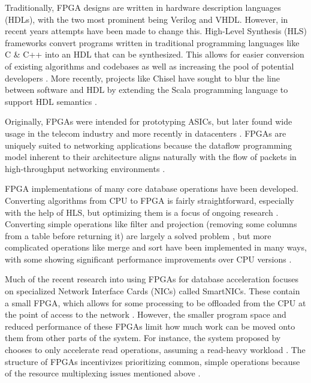 Traditionally, FPGA designs are written in hardware description languages
(HDLs), with the two most prominent being Verilog and VHDL. However, in recent
years attempts have been made to change this. High-Level Synthesis (HLS)
frameworks convert programs written in traditional programming languages like C
\& C++ into an HDL that can be synthesized. This allows for easier conversion of
existing algorithms and codebases as well as increasing the pool of potential
developers \autocite{martin-destest-2009}. More recently, projects like Chisel
have sought to blur the line between software and HDL by extending the Scala programming language to support HDL
semantics \autocite{chisel}.


\label{sec:datacenter-fpga}

Originally, FPGAs were intended for prototyping ASICs, but later found wide
usage in the telecom industry \autocite{bobda-trets-2022,mencer-queue-2020} and
more recently in datacenters \autocite{mencer-queue-2020,hoozemans-cas-2021}.
FPGAs are uniquely suited to networking applications because the dataflow
programming model \autocite{hoozemans-cas-2021} inherent to their architecture
aligns naturally with the flow of packets in high-throughput networking
environments \autocite{mueller-sigmod-2009}.

FPGA implementations of many core database operations have been developed.
Converting algorithms from CPU to FPGA is fairly straightforward, especially
with the help of HLS, but optimizing them is a focus of ongoing research
\autocite{fang-vldb-2020}. Converting simple operations like filter and
projection (removing some columns from a table before returning it) are largely
a solved problem \autocite{fang-vldb-2020}, but more complicated operations like
merge and sort have been implemented in many ways, with some showing significant
performance improvements over CPU versions
\autocite{leggett-trets-2025,moghaddamfar-damon-2021}.

Much of the recent research into using FPGAs for database acceleration focuses
on specialized Network Interface Cards (NICs) called SmartNICs. These contain a
small FPGA, which allows for some processing to be offloaded from the CPU at the
point of access to the network \autocite{strom,honeycomb}. However, the smaller
program space and reduced performance of these FPGAs limit how much work can be
moved onto them from other parts of the system. For instance, the
 system proposed by \citeauthor{honeycomb} chooses to only
accelerate read operations, assuming a read-heavy workload \autocite{honeycomb}.
The structure of FPGAs incentivizes prioritizing common, simple operations
because of the resource multiplexing issues mentioned above
\autocite{honeycomb,moghaddamfar-damon-2021}.
